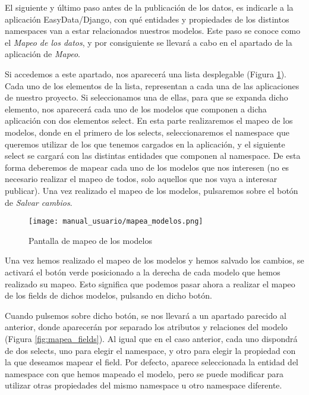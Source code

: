 El siguiente y último paso antes de la publicación de los datos, es indicarle a
la aplicación EasyData/Django, con qué entidades y propiedades de los distintos
namespaces van a estar relacionados nuestros modelos. Este paso se conoce como
el \textit{Mapeo de los datos}, y por consiguiente se llevará a cabo en el
apartado de la aplicación de \textit{Mapeo}.

Si accedemos a este apartado, nos aparecerá una lista desplegable (Figura
\ref{fig:mapea_modelos}). Cada uno de los elementos de la lista, representan a
cada una de las aplicaciones de nuestro proyecto. Si seleccionamos una de ellas,
para que se expanda dicho elemento, nos aparecerá cada uno de los modelos que
componen a dicha aplicación con dos elementos select. En esta parte realizaremos
el mapeo de los modelos, donde en el primero de los selects, seleccionaremos el
namespace que queremos utilizar de los que tenemos cargados en la aplicación, y
el siguiente select se cargará con las distintas entidades que componen al
namespace. De esta forma deberemos de mapear cada uno de los modelos que nos
interesen (no es necesario realizar el mapeo de todos, solo aquellos que nos
vaya a interesar publicar). Una vez realizado el mapeo de los modelos,
pulsaremos sobre el botón de \textit{Salvar cambios}.

\newpage

\begin{figure}[H]
    \begin{center}
        \texttt{[image: manual\_usuario/mapea\_modelos.png]}
    \end{center}
    \caption{Pantalla de mapeo de los modelos}
    \label{fig:mapea_modelos}
\end{figure}

Una vez hemos realizado el mapeo de los modelos y hemos salvado los cambios, se
activará el botón verde posicionado a la derecha de cada modelo que hemos
realizado su mapeo. Esto significa que podemos pasar ahora a realizar el mapeo
de los fields de dichos modelos, pulsando en dicho botón.

Cuando pulsemos sobre dicho botón, se nos llevará a un apartado parecido al
anterior, donde aparecerán por separado los atributos y relaciones del modelo
(Figura \ref{fig:mapea_fields}). Al igual que en el caso anterior, cada uno
dispondrá de dos selects, uno para elegir el namespace, y otro para elegir la
propiedad con la que deseamos mapear el field. Por defecto, aparece seleccionada
la entidad del namespace con que hemos mapeado el modelo, pero se puede
modificar para utilizar otras propiedades del mismo namespace u otro namespace
diferente.

